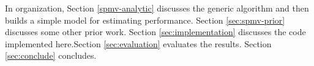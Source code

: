 In organization, Section \ref{spmv-analytic} discusses the generic algorithm and then builds a simple model for estimating performance. Section \ref{sec:spmv-prior} discusses some other prior work. Section \ref{sec:implementation} discusses the code implemented here.Section \ref{sec:evaluation} evaluates the results. Section \ref{sec:conclude} concludes.

